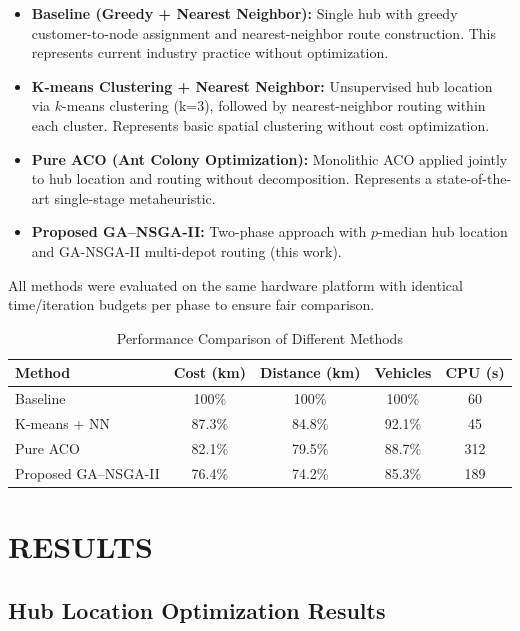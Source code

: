 \documentclass[conference]{IEEEtran}
\begin{document}
\begin{itemize}
\item \textbf{Baseline (Greedy + Nearest Neighbor):} Single hub with greedy customer-to-node assignment and nearest-neighbor route construction. This represents current industry practice without optimization.
\item \textbf{K-means Clustering + Nearest Neighbor:} Unsupervised hub location via $k$-means clustering (k=3), followed by nearest-neighbor routing within each cluster. Represents basic spatial clustering without cost optimization.
\item \textbf{Pure ACO (Ant Colony Optimization):} Monolithic ACO applied jointly to hub location and routing without decomposition. Represents a state-of-the-art single-stage metaheuristic.
\item \textbf{Proposed GA–NSGA-II:} Two-phase approach with $p$-median hub location and GA-NSGA-II multi-depot routing (this work).
\end{itemize}

All methods were evaluated on the same hardware platform with identical time/iteration budgets per phase to ensure fair comparison.

\begin{table}[htbp]
\caption{Performance Comparison of Different Methods}
\label{tab:comparison}
\centering
\renewcommand{\arraystretch}{1.3}
\begin{tabular}{|l|c|c|c|c|}
\hline
\textbf{Method} & \textbf{Cost (km)} & \textbf{Distance (km)} & \textbf{Vehicles} & \textbf{CPU (s)} \\
\hline
Baseline & 100\% & 100\% & 100\% & 60 \\
\hline
K-means + NN & 87.3\% & 84.8\% & 92.1\% & 45 \\
\hline
Pure ACO & 82.1\% & 79.5\% & 88.7\% & 312 \\
\hline
Proposed GA–NSGA-II & 76.4\% & 74.2\% & 85.3\% & 189 \\
\hline
\end{tabular}
\end{table}

\section{RESULTS}

\subsection{Hub Location Optimization Results}
\end{document}
